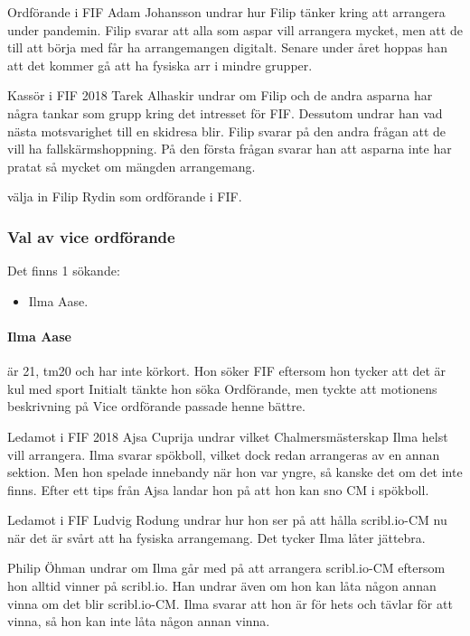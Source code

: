 \documentclass[hidelinks]{sektionsmote}
\begin{document}
Ordförande i FIF Adam Johansson undrar hur Filip tänker kring att arrangera under pandemin.
Filip svarar att alla som aspar vill arrangera mycket, men att de till att börja med får ha arrangemangen digitalt.
Senare under året hoppas han att det kommer gå att ha fysiska arr i mindre grupper.

Kassör i FIF 2018 Tarek Alhaskir undrar om Filip och de andra asparna har några tankar som grupp kring det intresset för FIF.
Dessutom undrar han vad nästa motsvarighet till en skidresa blir.
Filip svarar på den andra frågan att de vill ha fallskärmshoppning.
På den första frågan svarar han att asparna inte har pratat så mycket om mängden arrangemang.

\begin{beslut}
  \item välja in Filip Rydin som ordförande i FIF.
\end{beslut}


\subsubsection{Val av vice ordförande}
Det finns 1 sökande:
\begin{itemize}
    \item Ilma Aase.
\end{itemize}

\paragraph{Ilma Aase} är 21, tm20 och har inte körkort.
Hon söker FIF eftersom hon tycker att det är kul med sport
Initialt tänkte hon söka Ordförande, men tyckte att motionens beskrivning på Vice ordförande passade henne bättre.

Ledamot i FIF 2018 Ajsa Cuprija undrar vilket Chalmersmästerskap Ilma helst vill arrangera.
Ilma svarar spökboll, vilket dock redan arrangeras av en annan sektion.
Men hon spelade innebandy när hon var yngre, så kanske det om det inte finns.
Efter ett tips från Ajsa landar hon på att hon kan sno CM i spökboll.

Ledamot i FIF Ludvig Rodung undrar hur hon ser på att hålla scribl.io-CM nu när det är svårt att ha fysiska arrangemang.
Det tycker Ilma låter jättebra.

Philip Öhman undrar om Ilma går med på att arrangera scribl.io-CM eftersom hon alltid vinner på scribl.io.
Han undrar även om hon kan låta någon annan vinna om det blir scribl.io-CM.
Ilma svarar att hon är för hets och tävlar för att vinna, så hon kan inte låta någon annan vinna.
\end{document}
